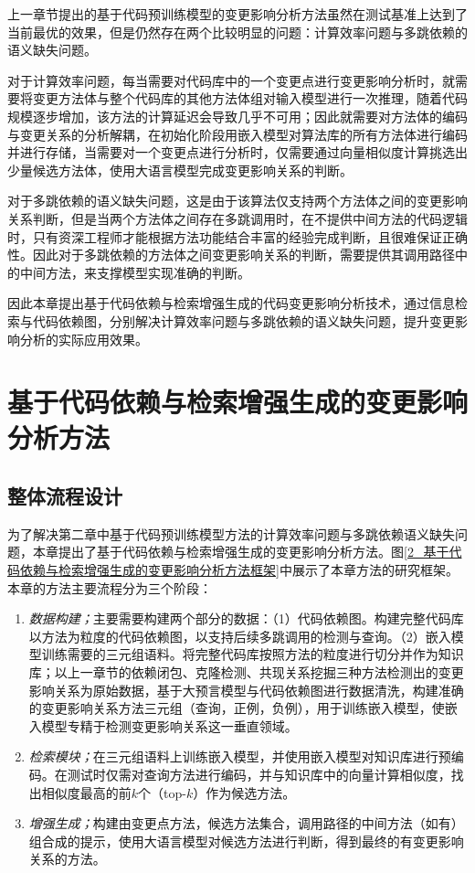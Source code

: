 上一章节提出的基于代码预训练模型的变更影响分析方法虽然在测试基准上达到了当前最优的效果，但是仍然存在两个比较明显的问题：计算效率问题与多跳依赖的语义缺失问题。

对于计算效率问题，每当需要对代码库中的一个变更点进行变更影响分析时，就需要将变更方法体与整个代码库的其他方法体组对输入模型进行一次推理，随着代码规模逐步增加，该方法的计算延迟会导致几乎不可用；因此就需要对方法体的编码与变更关系的分析解耦，在初始化阶段用嵌入模型对算法库的所有方法体进行编码并进行存储，当需要对一个变更点进行分析时，仅需要通过向量相似度计算挑选出少量候选方法体，使用大语言模型完成变更影响关系的判断。

对于多跳依赖的语义缺失问题，这是由于该算法仅支持两个方法体之间的变更影响关系判断，但是当两个方法体之间存在多跳调用时，在不提供中间方法的代码逻辑时，只有资深工程师才能根据方法功能结合丰富的经验完成判断，且很难保证正确性。因此对于多跳依赖的方法体之间变更影响关系的判断，需要提供其调用路径中的中间方法，来支撑模型实现准确的判断。

因此本章提出基于代码依赖与检索增强生成的代码变更影响分析技术，通过信息检索与代码依赖图，分别解决计算效率问题与多跳依赖的语义缺失问题，提升变更影响分析的实际应用效果。


\section{基于代码依赖与检索增强生成的变更影响分析方法}


\subsection{整体流程设计}

为了解决第二章中基于代码预训练模型方法的计算效率问题与多跳依赖语义缺失问题，本章提出了基于代码依赖与检索增强生成的变更影响分析方法。图\ref{2_基于代码依赖与检索增强生成的变更影响分析方法框架}中展示了本章方法的研究框架。本章的方法主要流程分为三个阶段：

\begin{enumerate}

    \item \textit{数据构建；}主要需要构建两个部分的数据：（1）代码依赖图。构建完整代码库以方法为粒度的代码依赖图，以支持后续多跳调用的检测与查询。（2）嵌入模型训练需要的三元组语料。将完整代码库按照方法的粒度进行切分并作为知识库；以上一章节的依赖闭包、克隆检测、共现关系挖掘三种方法检测出的变更影响关系为原始数据，基于大预言模型与代码依赖图进行数据清洗，构建准确的变更影响关系方法三元组（查询，正例，负例），用于训练嵌入模型，使嵌入模型专精于检测变更影响关系这一垂直领域。

    \item \textit{检索模块；}在三元组语料上训练嵌入模型，并使用嵌入模型对知识库进行预编码。在测试时仅需对查询方法进行编码，并与知识库中的向量计算相似度，找出相似度最高的前$k$个（top-$k$）作为候选方法。
    
    \item \textit{增强生成；}构建由变更点方法，候选方法集合，调用路径的中间方法（如有）组合成的提示，使用大语言模型对候选方法进行判断，得到最终的有变更影响关系的方法。
    
\end{enumerate}

